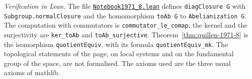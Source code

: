 \emph{Verification in Lean.} The file \href{\leanblobmain/Notebook1971_8.lean}{\texttt{Notebook1971\_8.\allowbreak{}lean}} defines \texttt{diagClosure G} with \texttt{Subgroup.normalClosure} and the homomorphism \texttt{toAb G} to \texttt{Abelianization G}. The computation with commutators is \texttt{commutator\_le\_comap}; the kernel and the surjectivity are \texttt{ker\_toAb} and \texttt{toAb\_surjective}. Theorem~\ref{thm:quillen-1971-8} is the isomorphism \texttt{quotientEquiv}, with its formula \texttt{quotientEquiv\_mk}. The topological statements of the page, on local systems and on the fundamental group of the space, are not formalised. The axioms used are the three usual axioms of mathlib.

